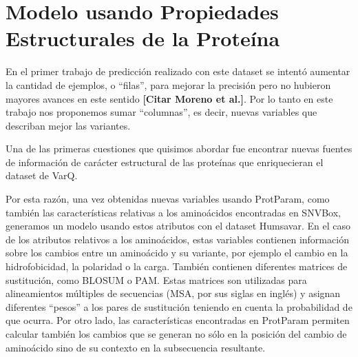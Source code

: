 \section{Modelo usando Propiedades Estructurales de la Proteína}

En el primer trabajo de predicción realizado con este dataset  se intentó aumentar la cantidad de ejemplos, o ``filas'', para mejorar la precisión pero no hubieron mayores avances en este sentido \textbf{[Citar Moreno et al.]}. Por lo tanto en este trabajo nos proponemos sumar ``columnas'', es decir, nuevas variables que describan mejor las variantes.

Una de las primeras cuestiones que quisimos abordar fue encontrar nuevas fuentes de información de carácter estructural de las proteínas que enriquecieran el dataset de VarQ. 



Por esta razón, una vez obtenidas nuevas variables usando ProtParam, como también las características relativas a los aminoácidos encontradas en SNVBox, generamos un modelo usando estos atributos con el dataset Humsavar. En el caso de los atributos relativos a los aminoácidos, estas variables contienen información sobre los cambios entre un aminoácido y su variante, por ejemplo el cambio en la hidrofobicidad, la polaridad o la carga. También contienen diferentes matrices de sustitución, como BLOSUM o PAM. Estas matrices son utilizadas para alineamientos múltiples de secuencias (MSA, por sus siglas en inglés) y asignan diferentes ``pesos'' a los pares de sustitución teniendo en cuenta la probabilidad de que ocurra. Por otro lado, las características encontradas en ProtParam permiten calcular también los cambios que se generan no sólo en la posición del cambio de aminoácido sino de su contexto en la subsecuencia resultante. 



